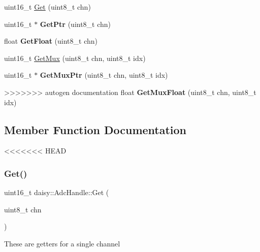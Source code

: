 \begin{DoxyCompactItemize}
\item 
uint16\+\_\+t \hyperlink{classdaisy_1_1_adc_handle_a3350141272ccbb34ec3f028a60c684ca}{Get} (uint8\+\_\+t chn)
\item 
\mbox{\label{classdaisy_1_1_adc_handle_a4125ddcd93848e76639099b76e8cc83c}} 
uint16\+\_\+t $\ast$ {\bfseries Get\+Ptr} (uint8\+\_\+t chn)
\item 
\mbox{\label{classdaisy_1_1_adc_handle_a57d89fb8e75503b2dbd93d7ce73e54c5}} 
float {\bfseries Get\+Float} (uint8\+\_\+t chn)
\item 
uint16\+\_\+t \hyperlink{classdaisy_1_1_adc_handle_ae1cc9052337f727e7f5e32cdc3cb3602}{Get\+Mux} (uint8\+\_\+t chn, uint8\+\_\+t idx)
\item 
\mbox{\label{classdaisy_1_1_adc_handle_a9830904d95f94f72aa68fd8542321a4f}} 
uint16\+\_\+t $\ast$ {\bfseries Get\+Mux\+Ptr} (uint8\+\_\+t chn, uint8\+\_\+t idx)
\item 
\mbox{\label{classdaisy_1_1_adc_handle_a55c9cd1051446d02fe368d118387fd25}} 
>>>>>>> autogen documentation
float {\bfseries Get\+Mux\+Float} (uint8\+\_\+t chn, uint8\+\_\+t idx)
\end{DoxyCompactItemize}


\subsection{Member Function Documentation}
<<<<<<< HEAD
\mbox{\label{classdaisy_1_1_adc_handle_a48bd9dd7c3aed8c38bbd2d481bd64438}} 
\subsubsection{\texorpdfstring{Get()}{Get()}}
{\footnotesize\ttfamily uint16\+\_\+t daisy\+::\+Adc\+Handle\+::\+Get (\begin{DoxyParamCaption}\item[{uint8\+\_\+t}]{chn }\end{DoxyParamCaption})}

These are getters for a single channel \mbox{\label{classdaisy_1_1_adc_handle_ac77bcec5738d2ebdd47a8bddbc3d944c}} 
